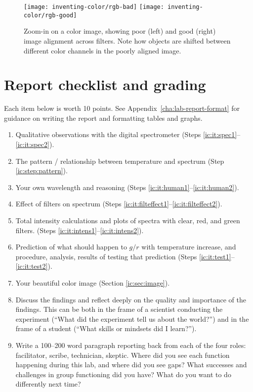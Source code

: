 \begin{figure}
	\texttt{[image: inventing-color/rgb-bad]}
	\texttt{[image: inventing-color/rgb-good]}
	\caption{Zoom-in on a color image, showing poor (left) and good (right) image alignment across filters. Note how objects are shifted between different color channels in the poorly aligned image.}\label{ic:fig:rgb-bad}
\end{figure}

\section{Report checklist and grading}

Each item below is worth 10 points. See Appendix\ \ref{cha:lab-report-format} for guidance on writing the report and formatting tables and graphs.

\begin{enumerate}
	\item Qualitative observations with the digital spectrometer (Steps \ref{ic:it:spec1}--\ref{ic:it:spec2}).
	\item The pattern / relationship between temperature and spectrum (Step \ref{ic:step:pattern}).
	\item Your own wavelength and reasoning (Steps \ref{ic:it:human1}--\ref{ic:it:human2}).
	\item Effect of filters on spectrum (Steps \ref{ic:it:filteffect1}--\ref{ic:it:filteffect2}).
	\item Total intensity calculations and plots of spectra with clear, red, and green filters. (Steps \ref{ic:it:intens1}--\ref{ic:it:intens2}).
	\item Prediction of what should happen to $g/r$ with temperature increase, and procedure, analysis, results of testing that prediction (Steps \ref{ic:it:test1}--\ref{ic:it:test2}).
	\item Your beautiful color image (Section \ref{ic:sec:image}).
	\item Discuss the findings and reflect deeply on the quality and importance of
	the findings. This can be both in the frame of a scientist conducting the
	experiment (“What did the experiment tell us about the world?”) and in the
	frame of a student (“What skills or mindsets did I learn?”).
	\item Write a 100--200 word paragraph reporting back from each of the four roles: facilitator, scribe, technician, skeptic. Where did you see each function happening during this lab, and where did you see gaps? What successes and challenges in group functioning did you have? What do you want to do differently next time?
\end{enumerate}
